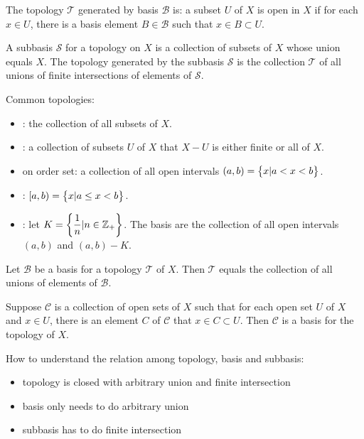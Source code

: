The topology $\mathcal{T}$ generated by basis $\mathcal{B}$ is: a subset $U$ of $X$ is open in $X$ if for each $x \in U$, there is a basis element $B \in \mathcal{B}$ such that $x \in B \subset U$.


\begin{definition}
    A subbasis $\mathcal{S}$ for a topology on $X$ is a collection of subsets of $X$ whose union equals $X$. The topology generated by the subbasis $\mathcal{S}$ is the collection $\mathcal{T}$ of all unions of finite intersections of elements of $\mathcal{S}$.
\end{definition}


Common topologies:
\begin{itemize}
    \item {}: the collection of all subsets of $X$.
    \item {}: a collection of subsets $U$ of $X$ that $X - U$ is either finite or all of $X$.
    \item {} on order set: a collection of all open intervals $(a,b) = \set{x | a < x < b}$.
    \item {} : $[a,b) = \set{x | a \leq x < b}$.
    \item {}: let $K = \set{\displaystyle \frac{1}{n} | n \in \mathbb{Z}_{+}}$. The basis are the collection of all open intervals $(a,b)$ and $(a,b) - K$.
\end{itemize}


\begin{theorem}
    Let $\mathcal{B}$ be a basis for a topology $\mathcal{T}$ of $X$. Then $\mathcal{T}$ equals the collection of all unions of elements of $\mathcal{B}$.
\end{theorem}

\begin{theorem}
    Suppose $\mathcal{C}$ is a collection of open sets of $X$ such that for each open set $U$ of $X$ and $x \in U$, there is an element $C$ of $\mathcal{C}$ that $x \in C \subset U$. Then $\mathcal{C}$ is a basis for the topology of $X$.    
\end{theorem}


How to understand the relation among topology, basis and subbasis:
\begin{itemize}
    \item topology is closed with arbitrary union and finite intersection
    \item basis only needs to do arbitrary union
    \item subbasis has to do finite intersection
\end{itemize}

